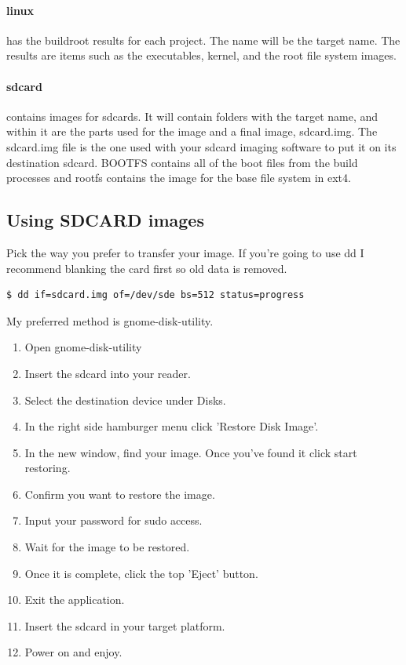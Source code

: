\paragraph{linux} has the buildroot results for each project. The name will be the target name. The results are items such as the executables, kernel,
and the root file system images.

\paragraph{sdcard} contains images for sdcards. It will contain folders with the target name, and within it are the parts used for the image and a
final image, sdcard.img. The sdcard.img file is the one used with your sdcard imaging software to put it on its destination sdcard. BOOTFS contains
all of the boot files from the build processes and rootfs contains the image for the base file system in ext4.

\subsection{Using SDCARD images}
\par
Pick the way you prefer to transfer your image. If you're going to use dd I recommend blanking the card first so old data is removed.
\begin{lstlisting}[language=bash]
$ dd if=sdcard.img of=/dev/sde bs=512 status=progress
\end{lstlisting}
My preferred method is gnome-disk-utility.
\begin{enumerate}
\item Open gnome-disk-utility
\item Insert the sdcard into your reader.
\item Select the destination device under Disks.
\item In the right side hamburger menu click 'Restore Disk Image'.
\item In the new window, find your image. Once you've found it click start restoring.
\item Confirm you want to restore the image.
\item Input your password for sudo access.
\item Wait for the image to be restored.
\item Once it is complete, click the top 'Eject' button.
\item Exit the application.
\item Insert the sdcard in your target platform.
\item Power on and enjoy.
\end{enumerate}

